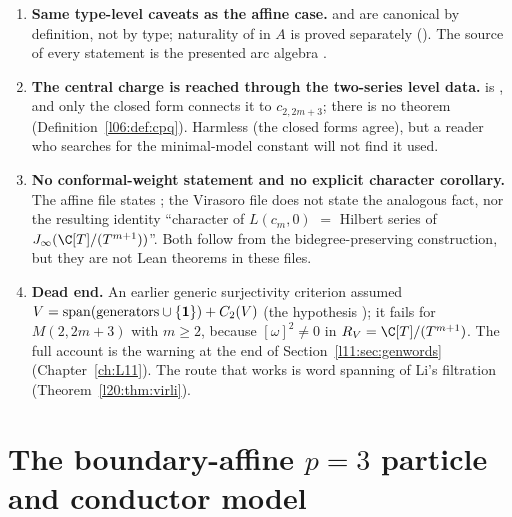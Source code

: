 \begin{warning}[title={Points a referee should know about the Virasoro companion}]
\begin{enumerate}
\item \textbf{Same type-level caveats as the affine case.}  and  are canonical by
  definition, not by type; naturality of  in $A$ is proved separately
  ().
  The source of every statement is the presented arc algebra .
\item \textbf{The central charge is reached through the two-series level data.}  is , and
  only the closed form  connects it to $c_{2,2m+3}$; there is no theorem
   (Definition~\ref{l06:def:cpq}). Harmless (the closed forms agree), but a
  reader who searches for the minimal-model constant will not find it used.
\item \textbf{No conformal-weight statement and no explicit character corollary.} The affine file states
  ; the Virasoro file does not state the analogous fact, nor the resulting identity
  ``character of $L(c_m,0)$ $=$ Hilbert series of $\ltwentyJ(\C[T]/(T^{m+1}))$''. Both follow from the bidegree-preserving
  construction, but they are not Lean theorems in these files.
\item \textbf{Dead end.} An earlier generic surjectivity criterion assumed
  $V=\operatorname{span}(\text{generators}\cup\{\mathbf{1}\})+C_2(V)$ (the hypothesis ); it fails for
  $M(2,2m+3)$ with $m\ge2$, because $[\omega]^2\neq0$ in $R_V=\C[T]/(T^{m+1})$. The full account is the warning at the end of
  Section~\ref{l11:sec:genwords} (Chapter~\ref{ch:L11}). The route that works is word spanning of Li's filtration
  (Theorem~\ref{l20:thm:virli}).
\end{enumerate}
\end{warning}

\section{The boundary-affine \texorpdfstring{$p=3$}{p=3} particle and conductor model}\label{l20:sec:p3}

